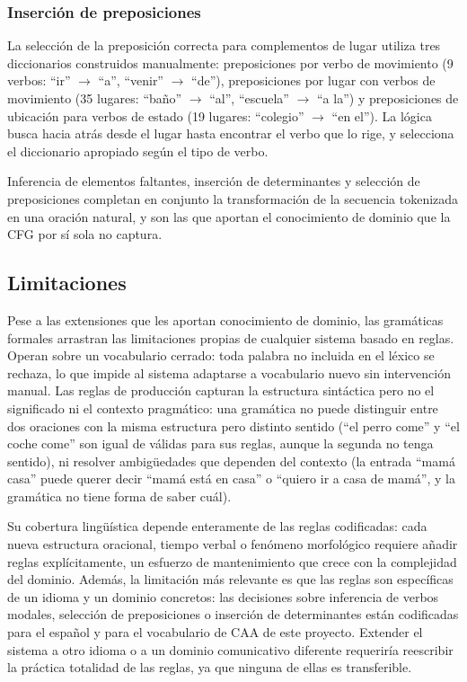 \subsubsection{Inserción de preposiciones}

La selección de la preposición correcta para complementos de lugar utiliza tres diccionarios construidos manualmente: preposiciones por verbo de movimiento (9 verbos: ``ir'' $\rightarrow$ ``a'', ``venir'' $\rightarrow$ ``de''), preposiciones por lugar con verbos de movimiento (35 lugares: ``baño'' $\rightarrow$ ``al'', ``escuela'' $\rightarrow$ ``a la'') y preposiciones de ubicación para verbos de estado (19 lugares: ``colegio'' $\rightarrow$ ``en el''). La lógica busca hacia atrás desde el lugar hasta encontrar el verbo que lo rige, y selecciona el diccionario apropiado según el tipo de verbo.

Inferencia de elementos faltantes, inserción de determinantes y selección de preposiciones completan en conjunto la transformación de la secuencia tokenizada en una oración natural, y son las que aportan el conocimiento de dominio que la CFG por sí sola no captura.

\subsection{Limitaciones}
\label{sec:f1-limitaciones}

Pese a las extensiones que les aportan conocimiento de dominio, las gramáticas formales arrastran las limitaciones propias de cualquier sistema basado en reglas. Operan sobre un vocabulario cerrado: toda palabra no incluida en el léxico se rechaza, lo que impide al sistema adaptarse a vocabulario nuevo sin intervención manual. Las reglas de producción capturan la estructura sintáctica pero no el significado ni el contexto pragmático: una gramática no puede distinguir entre dos oraciones con la misma estructura pero distinto sentido (``el perro come'' y ``el coche come'' son igual de válidas para sus reglas, aunque la segunda no tenga sentido), ni resolver ambigüedades que dependen del contexto (la entrada ``mamá casa'' puede querer decir ``mamá está en casa'' o ``quiero ir a casa de mamá'', y la gramática no tiene forma de saber cuál).

Su cobertura lingüística depende enteramente de las reglas codificadas: cada nueva estructura oracional, tiempo verbal o fenómeno morfológico requiere añadir reglas explícitamente, un esfuerzo de mantenimiento que crece con la complejidad del dominio. Además, la limitación más relevante es que las reglas son específicas de un idioma y un dominio concretos: las decisiones sobre inferencia de verbos modales, selección de preposiciones o inserción de determinantes están codificadas para el español y para el vocabulario de CAA de este proyecto. Extender el sistema a otro idioma o a un dominio comunicativo diferente requeriría reescribir la práctica totalidad de las reglas, ya que ninguna de ellas es transferible.

